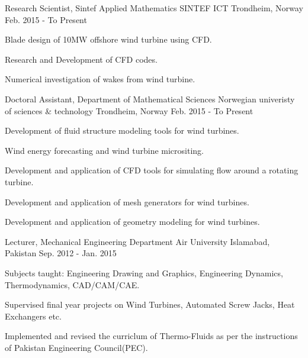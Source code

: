 

\begin{cventries}
	\cventry
	{Research Scientist, Sintef Applied Mathematics} %
	{SINTEF ICT} %
	{Trondheim, Norway} %
	{Feb. 2015 - To Present} %
	{
		\begin{cvitems} %
			\item {Blade design of 10MW offshore wind turbine using CFD.
			}
			\item {Research and Development of  CFD codes.}
			 \item{Numerical investigation of wakes from wind turbine.}
		\end{cvitems}
	}
	
  \cventry
  {Doctoral Assistant, Department of Mathematical Sciences} %
  {Norwegian univeristy of sciences \& technology} %
  {Trondheim, Norway} %
  {Feb. 2015 - To Present} %
  {
  	\begin{cvitems} %
  		\item {Development of fluid structure modeling tools for wind turbines.}
  		\item {Wind energy forecasting and wind turbine micrositing.}
  		\item {Development and application of CFD tools for simulating flow around a rotating turbine.}
  		\item{Development and application of mesh generators for wind turbines.}
  		\item{Development and application of geometry modeling for wind turbines.}
  	\end{cvitems}
  }
\cventry
{Lecturer, Mechanical Engineering Department} %
{Air University} %
{Islamabad, Pakistan} %
{Sep. 2012 - Jan. 2015} %
{
	\begin{cvitems} %
		\item {Subjects taught: Engineering Drawing and Graphics, Engineering Dynamics, Thermodynamics, CAD/CAM/CAE.}
		\item {Supervised final year projects on Wind Turbines, Automated Screw Jacks, Heat Exchangers etc.}
		\item {Implemented and revised the curriclum of Thermo-Fluids as per the instructions of Pakistan Engineering Council(PEC).}
	\end{cvitems}
}


\end{cventries}
